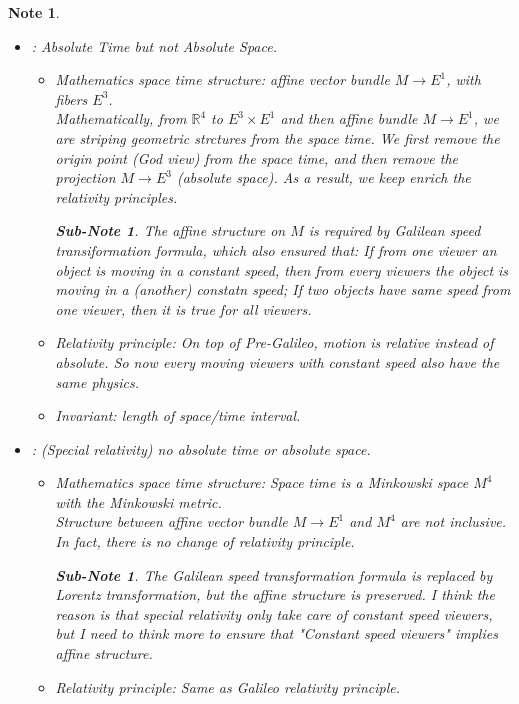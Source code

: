 \documentclass[pdf]{article}
\newtheorem{note}[theorem]{Note}
\newtheorem{subnote}[corollary]{Sub-Note}
\begin{document}
\begin{note}
\begin{itemize}
\begin{itemize}
	\item Invariant: length of space/time interval, and speed.
	\end{itemize}
\item [Galileo]: Absolute Time but not Absolute Space.
	\begin{itemize}
	\item Mathematics space time structure: affine vector bundle $M \to E^1$, with fibers $E^3$. \\
	Mathematically, from $\mathbb{R}^4$ to $E^3\times E^1$ and then affine bundle $M \to E^1$, we are striping geometric strctures from the space time. We first remove the origin point (God view) from the space time, and then remove the projection $M \to E^3$ (absolute space). As a result, we keep enrich the relativity principles.
	\begin{subnote} The affine structure on $M$ is required by Galilean speed transiformation formula, which also ensured that: If from one viewer an object is moving in a constant speed, then from every viewers the object is moving in a (another) constatn speed; If two objects have same speed from one viewer, then it is true for all viewers.\end{subnote}
	\item Relativity principle: On top of Pre-Galileo, motion is relative instead of absolute. So now every moving viewers with constant speed also have the same physics.
	\item Invariant: length of space/time interval.
	\end{itemize}  
\item [Einstein\_1]: (Special relativity) no absolute time or absolute space.
	\begin{itemize}
	\item Mathematics space time structure: Space time is a Minkowski space $M^4$ with the Minkowski metric. \\
	Structure between affine vector bundle $M \to E^1$ and $M^4$ are not inclusive. In fact, there is no change of relativity principle.
	\begin{subnote} The Galilean speed transformation formula is replaced by Lorentz transformation, but the affine structure is preserved. I think the reason is that special relativity only take care of constant speed viewers, but I need to think more to ensure that "Constant speed viewers" implies affine structure.\end{subnote}
	\item Relativity principle: Same as Galileo relativity principle. \\

\end{itemize}
\end{itemize}
\end{note}
\end{document}
